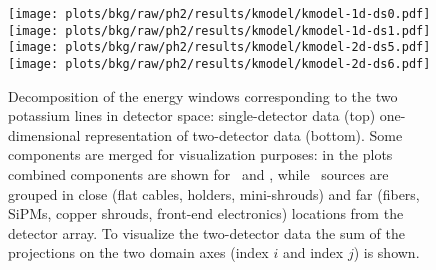 \begin{figure}
  \centering
  \texttt{[image: plots/bkg/raw/ph2/results/kmodel/kmodel-1d-ds0.pdf]}
  \texttt{[image: plots/bkg/raw/ph2/results/kmodel/kmodel-1d-ds1.pdf]}
  \texttt{[image: plots/bkg/raw/ph2/results/kmodel/kmodel-2d-ds5.pdf]}
  \texttt{[image: plots/bkg/raw/ph2/results/kmodel/kmodel-2d-ds6.pdf]}
  \caption{%
    Decomposition of the energy windows corresponding to the two potassium lines in
    detector space: single-detector data (top) one-dimensional representation of
    two-detector data (bottom). Some components are merged for visualization purposes: in
    the  plots combined components are shown for \kvz\ and \Bih, while \kvn\
    sources are grouped in close (flat cables, holders, mini-shrouds) and far (fibers,
    SiPMs, copper shrouds, front-end electronics) locations from the detector array. To
    visualize the two-detector data the sum of the projections on the two domain axes
    (index $i$ and index $j$) is shown.
  }\label{fig:bkg:raw:ph2:kmodel:base:results}
\end{figure}

\begin{table}
  \centering
  \caption{%
    Summary of the fit parameters estimated with the potassium source tracking analysis
    (base model). The type of prior distribution is indicated with \m{[f]}: flat, \m{[g]}:
    Gaussian. ($\,^{\dagger}$ Tetratex\reg-coated)
  }\label{tab:bkg:raw:ph2:kmodel:base:results}
  
\end{table}

